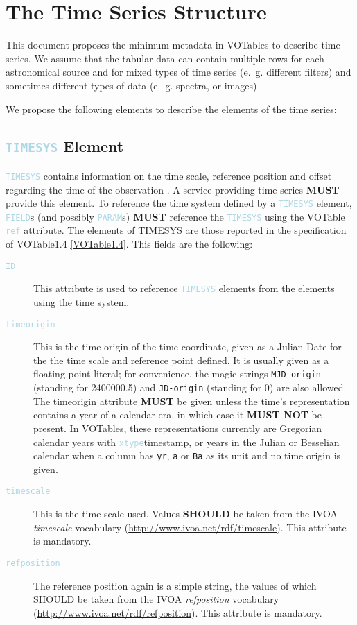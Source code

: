 \documentclass[11pt,a4paper]{ivoa}
\newcommand\elem[1]{\textcolor{LightBlue}{{\tt#1}}}
\begin{document}

\section{The Time Series Structure}
\label{elem:TIMESERIES}
This document proposes the minimum metadata in VOTables to describe time series. We assume that the tabular data can contain multiple rows for each astronomical source and for mixed types of time series (e.~g. different filters) and sometimes different types of data (e.~g. spectra, or images)

We propose the following elements to describe the elements of the time series: 

\subsection{\elem{TIMESYS} Element}
\elem{TIMESYS} contains information on the time scale, reference position and offset regarding the time of the observation \cite{VOTable1.4, TIMESYS}. A service providing time series \textbf{MUST} provide this element. To reference the time system defined by a \elem{TIMESYS} element, \elem{FIELD}s (and possibly \elem{PARAM}s) \textbf{MUST} reference the \elem{TIMESYS} using the VOTable \elem{ref} attribute. The elements of TIMESYS are those reported in the specification of VOTable1.4 \ref{VOTable1.4}. This fields are the following: 

\begin{description}
   \item[\elem{ID}] This attribute is used to reference \elem{TIMESYS} elements from the elements using the time system.
   \item[\elem{timeorigin}] This is the time origin of the time coordinate, given as a Julian Date for the the time scale and reference point
defined.  It is usually given as a floating point literal; for convenience, the magic strings \verb|MJD-origin| (standing
for 2400000.5) and \verb|JD-origin| (standing for 0) are also allowed. The timeorigin attribute \textbf{MUST} be given unless the time's representation contains a year of a calendar era, in which case it \textbf{MUST NOT} be present. In VOTables, these representations currently are Gregorian calendar years with \elem{xtype}{timestamp}, or years in the Julian or Besselian calendar when a column has \verb|yr|, \verb|a| or \verb|Ba| as its unit and no time origin is given. 
   \item[\elem{timescale}] This is the time scale used. Values \textbf{SHOULD} be taken from the IVOA \emph{timescale} vocabulary (\url{http://www.ivoa.net/rdf/timescale}). This attribute is mandatory.
   \item[\elem{refposition}] The reference position again is a simple string, the values of which SHOULD be taken from the IVOA \emph{refposition} vocabulary (\url{http://www.ivoa.net/rdf/refposition}). This attribute is mandatory.
\end{description}
\end{document}
